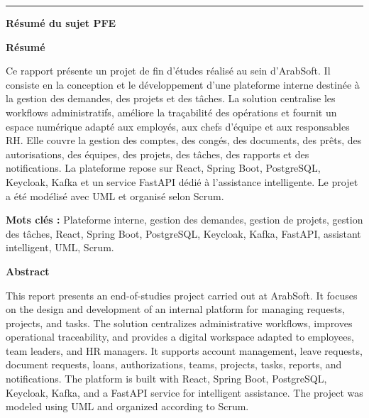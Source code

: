 \documentclass[a4paper,12pt]{article}
\begin{document}
\thispagestyle{empty}

\noindent\rule{\linewidth}{1.1pt}

\vspace{0.18cm}

\begin{center}
{\fontsize{16}{19}\selectfont\textbf{Résumé du sujet PFE}}
\end{center}

\vspace{0.18cm}

{\fontsize{10.7}{12.7}\selectfont

\textbf{Résumé}

\justifying
Ce rapport présente un projet de fin d’études réalisé au sein d’ArabSoft. Il consiste en la conception et le développement d’une plateforme interne destinée à la gestion des demandes, des projets et des tâches. La solution centralise les workflows administratifs, améliore la traçabilité des opérations et fournit un espace numérique adapté aux employés, aux chefs d’équipe et aux responsables RH. Elle couvre la gestion des comptes, des congés, des documents, des prêts, des autorisations, des équipes, des projets, des tâches, des rapports et des notifications. La plateforme repose sur React, Spring Boot, PostgreSQL, Keycloak, Kafka et un service FastAPI dédié à l’assistance intelligente. Le projet a été modélisé avec UML et organisé selon Scrum.

\textbf{Mots clés :} Plateforme interne, gestion des demandes, gestion de projets, gestion des tâches, React, Spring Boot, PostgreSQL, Keycloak, Kafka, FastAPI, assistant intelligent, UML, Scrum.

\vspace{0.12cm}

\textbf{Abstract}

\justifying
This report presents an end-of-studies project carried out at ArabSoft. It focuses on the design and development of an internal platform for managing requests, projects, and tasks. The solution centralizes administrative workflows, improves operational traceability, and provides a digital workspace adapted to employees, team leaders, and HR managers. It supports account management, leave requests, document requests, loans, authorizations, teams, projects, tasks, reports, and notifications. The platform is built with React, Spring Boot, PostgreSQL, Keycloak, Kafka, and a FastAPI service for intelligent assistance. The project was modeled using UML and organized according to Scrum.

}
\end{document}
